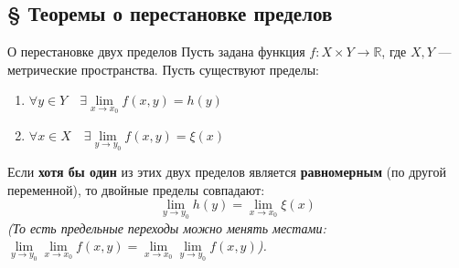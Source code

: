 \documentclass[12pt,a4paper]{article}
\begin{document}
\subsection{§ Теоремы о перестановке пределов}

\begin{Theorem}{О перестановке двух пределов}{}
Пусть задана функция $f: X \times Y \to \mathbb{R}$, где $X, Y$ — метрические пространства. Пусть существуют пределы:
\begin{enumerate}
    \item $\forall y \in Y \quad \exists \lim\limits_{x \to x_0} f(x,y) = h(y)$
    \item $\forall x \in X \quad \exists \lim\limits_{y \to y_0} f(x,y) = \xi(x)$
\end{enumerate}
Если \textbf{хотя бы один} из этих двух пределов является \textbf{равномерным} (по другой переменной), то двойные пределы совпадают:
$$ \lim\limits_{y \to y_0} h(y) = \lim\limits_{x \to x_0} \xi(x) $$
\textit{(То есть предельные переходы можно менять местами: $\lim\limits_{y \to y_0} \lim\limits_{x \to x_0} f(x,y) = \lim\limits_{x \to x_0} \lim\limits_{y \to y_0} f(x,y)$).}
\end{Theorem}
\end{document}
